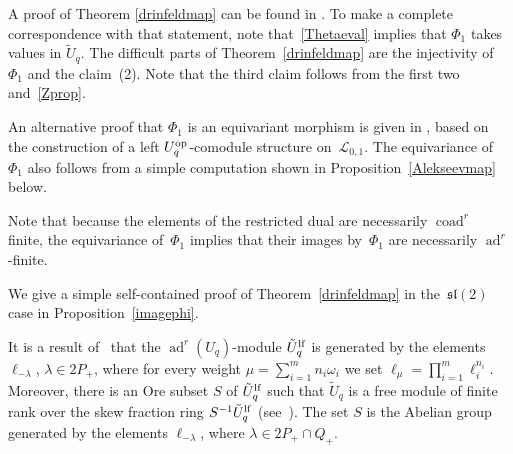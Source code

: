 \documentclass[pdftex]{sigma}%
\numberwithin{equation}{section}
\numberwithin{figure}{section}
\newcommand{\Ll}{{\mathcal L}}
\begin{document}
A proof of Theorem \ref{drinfeldmap} can be found in \cite[Theorem~3]{Bau1}. To make a complete correspondence with that statement, note that~\eqref{Thetaeval} implies that $\Phi_1$ takes values in $\tilde U_q$. The difficult parts of Theorem~\ref{drinfeldmap} are the injectivity of $\Phi_1$ and the claim~(2). Note that the third claim follows from the first two and~\eqref{Zprop}.

An alternative proof that $\Phi_1$ is an equivariant morphism is given in \cite[Proposition~4.7]{DM}, based on the construction of a left $U_q^{\rm op}$-comodule structure on~$\Ll_{0,1}$. The equivariance of~$\Phi_1$ also follows from a simple computation shown in Proposition~\ref{Alekseevmap} below.

Note that because the elements of the restricted dual are necessarily $\operatorname{coad}^r$ finite, the equi\-va\-ri\-ance of~$\Phi_1$ implies that their images by~$\Phi_1$ are necessarily $\operatorname{ad}^r$-finite.

\begin{remk} We give a simple self-contained proof of Theorem~\ref{drinfeldmap} in the~${\mathfrak{sl}}(2)$ case in Proposition~\ref{imagephi}.
\end{remk}

\begin{remk}\label{remlf} It is a result of~\cite{JL} that the $\operatorname{ad}^r(U_q)$-module $\tilde{U}_q^{\rm lf}$ is generated by the elements $\ell_{-\lambda}$, $\lambda\in 2P_+$, where for every weight $\mu = \sum_{i=1}^m n_i\omega_i$ we set $\ell_\mu = \prod_{i=1}^m \ell_i^{n_i}$. Moreover, there is an Ore subset $S$ of $\tilde{U}_q^{\rm lf}$ such that $\tilde{U}_q$ is a free module of finite rank over the skew fraction ring $S^{-1}\tilde{U}_q^{\rm lf}$ (see~\cite{JL2}). The set $S$ is the Abelian group generated by the elements $\ell_{-\lambda}$, where $\lambda \in 2P_+ \cap Q_+$.
\end{remk}
\end{document}
